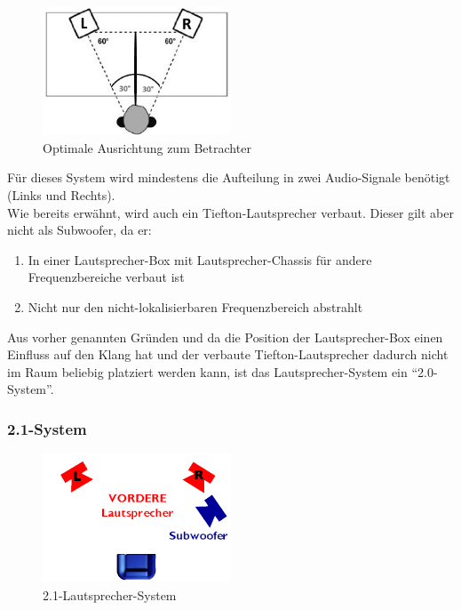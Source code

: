 \begin{figure} [H]
	\centering
	\includegraphics[width=0.5\textwidth]{img/Grundlagen/Mehrweg-Lautsprechersysteme/opt-20-aufstellung.jpg}
	\caption{Optimale Ausrichtung zum Betrachter}
	\label{fig:3.2.4}
\end{figure}

Für dieses System wird mindestens die Aufteilung in zwei Audio-Signale benötigt (Links und Rechts).\\
Wie bereits erwähnt, wird auch ein Tiefton-Lautsprecher verbaut.
Dieser gilt aber nicht als Subwoofer, da er:
\begin{enumerate}
	\item In einer Lautsprecher-Box mit Lautsprecher-Chassis für andere Frequenzbereiche verbaut ist
	\item Nicht nur den nicht-lokalisierbaren Frequenzbereich abstrahlt
\end{enumerate}
Aus vorher genannten Gründen und da die Position der Lautsprecher-Box einen Einfluss auf den Klang hat und der verbaute Tiefton-Lautsprecher dadurch nicht im Raum beliebig platziert werden kann, ist das Lautsprecher-System ein \enquote{2.0-System}.


\newpage
\subsubsection*{2.1-System}
\begin{figure} [H]
	\centering
	\includegraphics[width=0.5\textwidth]{img/Grundlagen/Mehrweg-Lautsprechersysteme/DOLBYDigital21-cut.jpg}
	\caption{2.1-Lautsprecher-System}
	\label{fig:3.2.5}
\end{figure}

